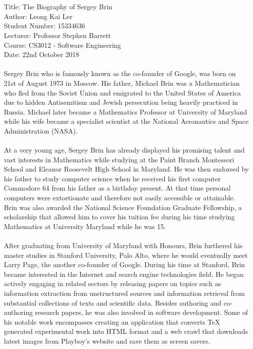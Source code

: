 \documentclass[12pt]{article}
\begin{document}
\begingroup
\fontsize{13pt}{12pt}\selectfont
\paragraph{} \hspace{0pt}\\
Title: The Biography of Sergey Brin \\
Author: Leong Kai Ler \\
Student Number: 15334636 \\
Lecturer: Professor Stephen Barrett \\
Course: CS3012 - Software Engineering \\
Date: 22nd October 2018  
\endgroup
\paragraph{} 
Sergey Brin who is famously known as the  co-founder of Google, was born on 21st of August 1973 in Moscow. His father, Michael Brin was a Mathematician who fled from the Soviet Union and emigrated to the United States of America due to hidden Antisemitism and Jewish persecution being heavily practiced in Russia. Michael later became a Mathematics Professor at University of Maryland while his wife became a specialist scientist at the National Aeronautics and Space Administration (NASA). 
\paragraph{}  
At a very young age, Sergey Brin has already displayed his promising talent and vast interests in Mathematics while studying at the Paint Branch Montessori School and  Eleanor Roosevelt High School in Maryland. He was then endorsed by his father to study computer science when he received his first computer Commodore 64 from his father as a birthday present. At that time personal computers were extortionate and therefore not easily accessible or attainable. Brin was also awarded the National Science Foundation Graduate Fellowship, a scholarship that allowed him to cover his tuition fee during his time studying Mathematics at University Maryland while he was 15.
\paragraph{}
After graduating from University of Maryland with Honours, Brin furthered his master studies in Stanford University, Palo Alto, where he would eventually meet Larry Page, the another co-founder of Google. During his time at Stanford, Brin became interested in the Internet and search engine technologies field. He began actively engaging in related sectors by releasing papers on topics such as information extraction from unstructured sources and information retrieval from substantial collections of texts and scientific data. Besides authoring and co-authoring research papers, he was also involved in software development. Some of his notable work encompasses creating an application that converts TeX generated experimental work into HTML format and a web crawl that downloads latest images from Playboy's website and save them as screen savers.  
\end{document}
